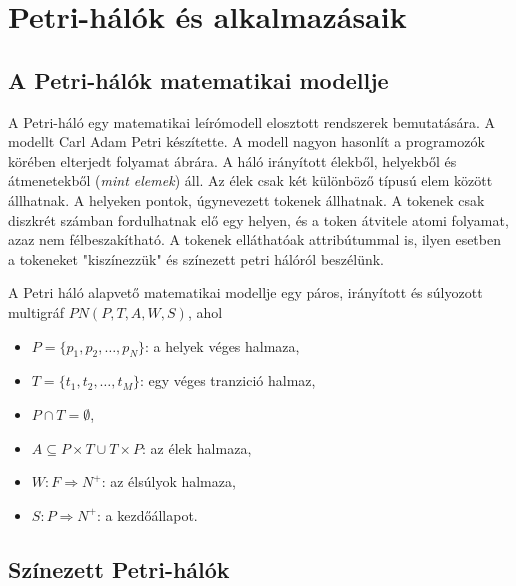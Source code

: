 \chapter{Petri-hálók és alkalmazásaik}

\section{A Petri-hálók matematikai modellje}

A Petri-háló egy matematikai leírómodell elosztott rendszerek bemutatására.
A modellt Carl Adam Petri készítette.
A modell nagyon hasonlít a programozók körében elterjedt folyamat ábrára.
A háló irányított élekből, helyekből és átmenetekből (\textsl{mint elemek}) áll.
Az élek csak két különböző típusú elem között állhatnak.
A helyeken pontok, úgynevezett tokenek állhatnak.
A tokenek csak diszkrét számban fordulhatnak elő egy helyen, és a token átvitele atomi folyamat, azaz nem félbeszakítható.
A tokenek elláthatóak attribútummal is, ilyen esetben a tokeneket "kiszínezzük" és színezett petri hálóról beszélünk. %

A Petri háló alapvető matematikai modellje egy páros, irányított és súlyozott multigráf $PN(P,T,A,W,S)$, ahol 
\begin{itemize}
\item $P=\{ p_1,p_2,\ldots ,p_N \}$: a helyek véges halmaza,
\item $T=\{ t_1,t_2,\ldots ,t_M\}$: egy véges tranzició halmaz,
\item $P\cap T = \emptyset$,
\item $A \subseteq P\times T \cup T\times P$: az élek halmaza,
\item $W: F\Rightarrow N^+$: az élsúlyok halmaza,
\item $S: P\Rightarrow N^+$: a kezdőállapot.
\end{itemize}

\section{Színezett Petri-hálók}

